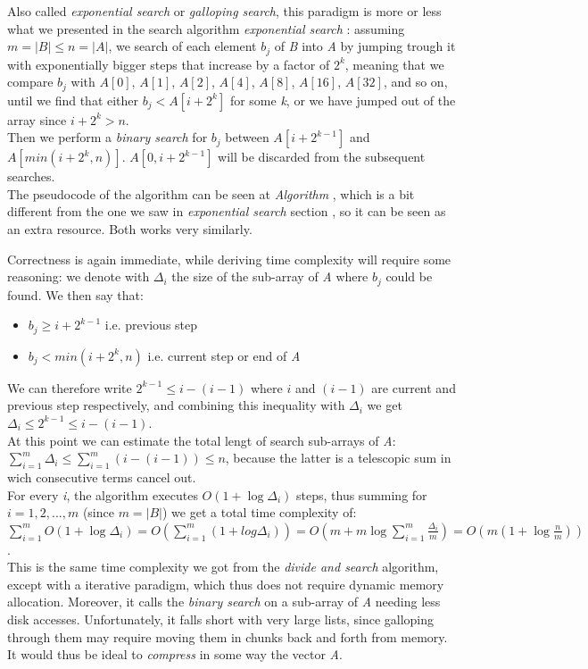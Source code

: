 Also called \textit{exponential search} or \textit{galloping search}, this paradigm is more or less what we presented in the search algorithm \textit{exponential search} : assuming $m=|B| \leq n=|A|$, we search of each element $b_j$ of \textit{B} into \textit{A} by jumping trough it with exponentially bigger steps that increase by a factor of $2^k$, meaning that we compare $b_j$ with $A[0]$, $A[1]$, $A[2]$, $A[4]$, $A[8]$, $A[16]$, $A[32]$, and so on, until we find that either $b_j<A\left[i+2^k\right]$ for some \textit{k}, or we have jumped out of the array since $i+2^k>n$.\\
Then we perform a \textit{binary search}  for $b_j$ between $A\left[i+2^{k-1}\right]$ and $A\left[min\left(i+2^k, n\right)\right]$. $A\left[0, i+2^{k-1}\right]$ will be discarded from the subsequent searches.\\
The pseudocode of the algorithm can be seen at \textit{Algorithm} , which is a bit different from the one we saw in \textit{exponential search} section , so it can be seen as an extra resource. Both works very similarly.

Correctness is again immediate, while deriving time complexity will require some reasoning: we denote with $\Delta_i$ the size of the sub-array of \textit{A} where $b_j$ could be found.
We then say that:
\begin{itemize} 
    \item $b_j \geq i+2^{k-1}$ i.e. previous step
    \item $b_j<min\left(i+2^k,n\right)$ i.e. current step or end of \textit{A}
\end{itemize}

We can therefore write $2^{k-1} \leq i-(i-1)$ where $i$ and $(i-1)$ are current and previous step respectively, and combining this inequality with $\Delta_i$ we get $\Delta_i \leq 2^{k-1} \leq i-(i-1)$. \\
At this point we can estimate the total lengt of search sub-arrays of \textit{A}: $\sum_{i=1}^{m} \Delta_i \leq \sum_{i=1}^{m} (i-(i-1)) \leq n$, because the latter is a telescopic sum in wich consecutive terms cancel out.\\
For every \textit{i}, the algorithm executes $O\left(1+ \log \Delta_i\right)$ steps, thus summing for $i = 1,2,...,m$ (since $m=|B|$) we get a total time complexity of:\\
$\sum_{i=1}^m O\left(1+ \log \Delta_i\right)=O\left(\sum_{i=1}^{m}\left(1+log \Delta_i\right)\right)=O\left(m+m \log \sum_{i=1}^m \frac{\Delta_i}{m}\right)=O\left(m\left(1+ \log \frac{n}{m}\right)\right)$.\\
This is the same time complexity we got from the \textit{divide and search}  algorithm, except with a iterative paradigm, which thus does not require dynamic memory allocation. Moreover, it calls the \textit{binary search}  on a sub-array of \textit{A} needing less disk accesses. Unfortunately, it falls short with very large lists, since galloping through them may require moving them in chunks back and forth from memory. It would thus be ideal to \textit{compress} in some way the vector \textit{A}.\\

